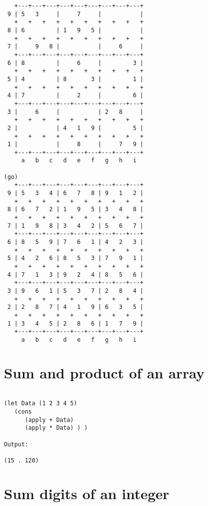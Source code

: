 \begin{verbatim}
   +---+---+---+---+---+---+---+---+---+
 9 | 5   3     |     7     |           |
   +   +   +   +   +   +   +   +   +   +
 8 | 6         | 1   9   5 |           |
   +   +   +   +   +   +   +   +   +   +
 7 |     9   8 |           |     6     |
   +---+---+---+---+---+---+---+---+---+
 6 | 8         |     6     |         3 |
   +   +   +   +   +   +   +   +   +   +
 5 | 4         | 8       3 |         1 |
   +   +   +   +   +   +   +   +   +   +
 4 | 7         |     2     |         6 |
   +---+---+---+---+---+---+---+---+---+
 3 |     6     |           | 2   8     |
   +   +   +   +   +   +   +   +   +   +
 2 |           | 4   1   9 |         5 |
   +   +   +   +   +   +   +   +   +   +
 1 |           |     8     |     7   9 |
   +---+---+---+---+---+---+---+---+---+
     a   b   c   d   e   f   g   h   i

(go)
   +---+---+---+---+---+---+---+---+---+
 9 | 5   3   4 | 6   7   8 | 9   1   2 |
   +   +   +   +   +   +   +   +   +   +
 8 | 6   7   2 | 1   9   5 | 3   4   8 |
   +   +   +   +   +   +   +   +   +   +
 7 | 1   9   8 | 3   4   2 | 5   6   7 |
   +---+---+---+---+---+---+---+---+---+
 6 | 8   5   9 | 7   6   1 | 4   2   3 |
   +   +   +   +   +   +   +   +   +   +
 5 | 4   2   6 | 8   5   3 | 7   9   1 |
   +   +   +   +   +   +   +   +   +   +
 4 | 7   1   3 | 9   2   4 | 8   5   6 |
   +---+---+---+---+---+---+---+---+---+
 3 | 9   6   1 | 5   3   7 | 2   8   4 |
   +   +   +   +   +   +   +   +   +   +
 2 | 2   8   7 | 4   1   9 | 6   3   5 |
   +   +   +   +   +   +   +   +   +   +
 1 | 3   4   5 | 2   8   6 | 1   7   9 |
   +---+---+---+---+---+---+---+---+---+
     a   b   c   d   e   f   g   h   i

\end{verbatim}

\section*{Sum and product of an array}

\begin{verbatim}

(let Data (1 2 3 4 5)
   (cons
      (apply + Data)
      (apply * Data) ) )

Output:

(15 . 120)

\end{verbatim}

\section*{Sum digits of an integer}

